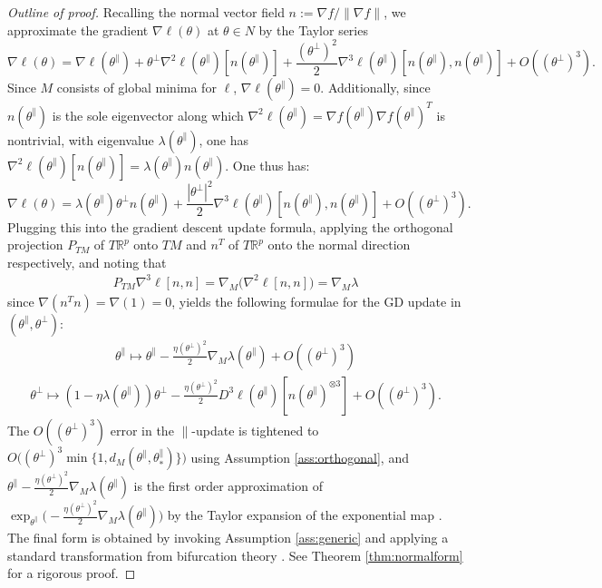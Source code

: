 \documentclass{article}
\newcommand{\RB}{\mathbb{R}}
\newcommand{\tpa}{\theta^{\parallel}}
\newcommand{\tpe}{\theta^{\perp}}
\theoremstyle{plain}
\theoremstyle{definition}
\theoremstyle{remark}
\begin{document}
\begin{proof}[Outline of proof]
    Recalling the normal vector field $n:=\nabla f/\|\nabla f\|$, we approximate the gradient $\nabla\ell(\theta)$ at $\theta\in N$ by the Taylor series
\begin{equation}
    \nabla\ell(\theta) = \nabla\ell(\theta^{\parallel})+\tpe\nabla^2\ell(\theta^{\parallel})[n(\tpa)]+\frac{(\tpe)^2}{2}\nabla^3\ell(\theta^{\parallel})[n(\tpa),n(\tpa)]+O((\tpe)^3).
\end{equation}
Since $M$ consists of global minima for $\ell$, $\nabla\ell(\theta^{\parallel}) = 0$. Additionally, since $n(\tpa)$ is the sole eigenvector along which $\nabla^2\ell(\theta^{\parallel}) = \nabla f(\theta^{\parallel})\nabla f(\theta^{\parallel})^T$ is nontrivial, with eigenvalue $\lambda(\tpa)$, one has $\nabla^2\ell(\theta^{\parallel})[n(\tpa)] = \lambda(\theta^{\parallel})n(\tpa)$. One thus has:
\begin{equation}\label{eq:gradientexpansion}
    \nabla\ell(\theta) = \lambda(\theta^{\parallel})\theta^{\perp}n(\tpa)+\frac{|\theta^{\perp}|^2}{2}\nabla^3\ell(\theta^{\parallel})[n(\tpa),n(\tpa)]+O((\tpe)^3).
\end{equation}
Plugging this into the gradient descent update formula, applying the orthogonal projection $P_{TM}$ of $T\RB^p$ onto $TM$ and $n^T$ of $T\RB^p$ onto the normal direction respectively, and noting that
\begin{align}
    P_{TM}\nabla^3\ell[n,n] = \nabla_M\big(\nabla^2\ell[n,n]\big) = \nabla_M\lambda
\end{align}
since $\nabla(n^Tn) = \nabla(1) = 0$, yields the following formulae for the GD update in $(\tpa,\tpe)$:
\begin{align}
    \tpa\mapsto \tpa-\frac{\eta(\tpe)^2}{2}\nabla_M\lambda(\tpa) + O((\tpe)^3)
\end{align}
\begin{align}
    \tpe\mapsto (1-\eta\lambda(\tpa))\tpe - \frac{\eta(\tpe)^2}{2}D^3\ell(\tpa)[n(\tpa)^{\otimes 3}]+O((\tpe)^3).
\end{align}
The $O((\tpe)^3)$ error in the $\parallel$-update is tightened to $O\big((\tpe)^3\min\{1,d_M(\tpa,\tpa_*)\}\big)$ using Assumption \ref{ass:orthogonal}, and $\tpa-\frac{\eta(\tpe)^2}{2}\nabla_M\lambda(\tpa)$ is the first order approximation of $\exp_{\tpa}\big(-\frac{\eta(\tpe)^2}{2}\nabla_M\lambda(\tpa)\big)$ by the Taylor expansion of the exponential map \cite{monera2014taylor}. The final form is obtained by invoking Assumption \ref{ass:generic} and applying a standard transformation from bifurcation theory \cite[Theorem 4.3]{kuznetsov}. See Theorem \ref{thm:normalform} for a rigorous proof.
\end{proof}
\end{document}
